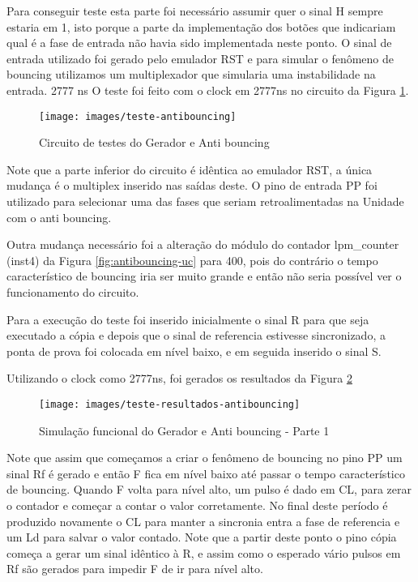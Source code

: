 \documentclass[12pt,a4paper,openany]{abntex2}
\begin{document}
Para conseguir teste esta parte foi necessário assumir quer o sinal H sempre estaria em 1, isto porque a parte da implementação dos botões que indicariam qual é a fase de entrada não havia sido implementada neste ponto. O sinal de entrada utilizado foi gerado pelo emulador RST e para simular o fenômeno de bouncing utilizamos um multiplexador que simularia uma instabilidade na entrada.
2777 ns
O teste foi feito com o clock em 2777ns no circuito da Figura \ref{fig:teste-antibouncing}.

\begin{figure}[!htp]
	\centering
	\caption{Circuito de testes do Gerador e Anti bouncing}
	\texttt{[image: images/teste-antibouncing]}	\label{fig:teste-antibouncing}
\end{figure}

Note que a parte inferior do circuito é idêntica ao emulador RST, a única mudança é o multiplex inserido nas saídas deste. O pino de entrada PP foi utilizado para selecionar uma das fases que seriam retroalimentadas na Unidade com o anti bouncing.

Outra mudança necessário foi a alteração do módulo do contador lpm\_counter (inst4) da Figura \ref{fig:antibouncing-uc} para 400, pois do contrário o tempo característico de bouncing iria ser muito grande e então não seria possível ver o funcionamento do circuito.

Para a execução do teste foi inserido inicialmente o sinal R para que seja executado a cópia e depois que o sinal de referencia estivesse sincronizado, a ponta de prova foi colocada em nível baixo, e em seguida inserido o sinal S.

Utilizando o clock como 2777ns, foi gerados os resultados da Figura \ref{fig:teste-resultados-antibouncing}

\begin{figure}[!htp]
	\centering
	\caption{Simulação funcional do Gerador e Anti bouncing - Parte 1}
	\texttt{[image: images/teste-resultados-antibouncing]}	\label{fig:teste-resultados-antibouncing}
\end{figure}

Note que assim que começamos a criar o fenômeno de bouncing no pino PP um sinal Rf é gerado e então F fica em nível baixo até passar o tempo característico de bouncing. Quando F volta para nível alto, um pulso é dado em CL, para zerar o contador e começar a contar o valor corretamente. No final deste período é produzido novamente o CL para manter a sincronia entra a fase de referencia e um Ld para salvar o valor contado. Note que a partir deste ponto o pino cópia começa a gerar um sinal idêntico à R, e assim como o esperado vário pulsos em Rf são gerados para impedir F de ir para nível alto.
\end{document}
